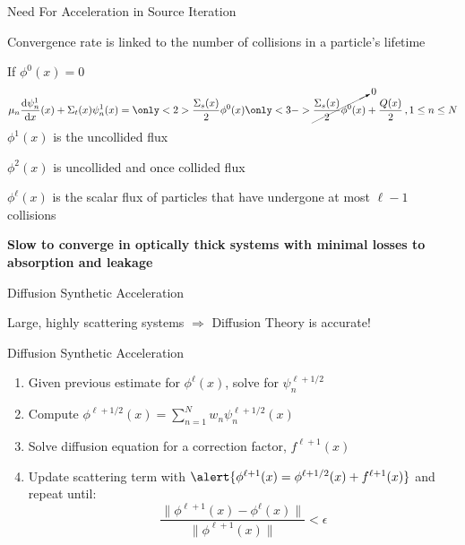 \documentclass[10pt]{beamer}
\newcommand{\ud}{\mathop{}\!\mathrm{d}} %
\newcommand{\dderiv}[2]{\frac{\ud #1}{\ud #2}}
\begin{document}
\begin{frame}{Need For Acceleration in Source Iteration}

	Convergence rate is linked to the number of collisions in a particle's lifetime

    If $\phi^0(x) = 0$
    \begin{equation*}
        \mu_n \dderiv{\psi_n^{1}}{x}(x) + \Sigma_t(x) \psi_n^{1}(x) =
        \vphantom{\cancelto{0}{\frac{\Sigma_s(x)}{2} \phi^{0}(x)}} 
        \only<2>{\frac{\Sigma_s(x)}{2} \phi^{0}(x)}
        \only<3->{\cancelto{0}{\frac{\Sigma_s(x)}{2} \phi^{0}(x)}}
         + \frac{Q(x)}{2} \,, 1 \leq n \leq N 
    \end{equation*}
    $\phi^1(x) $ is the uncollided flux 

    $\phi^2(x)$ is uncollided and once collided flux 

    $\phi^{\ell}(x)$ is the scalar flux of particles that have undergone at most $\ell - 1$ collisions 

    \textbf{Slow to converge in optically thick systems with minimal losses to absorption and leakage}

\end{frame}

\begin{frame}{Diffusion Synthetic Acceleration}

    Large, highly scattering systems $\Rightarrow$ Diffusion Theory is accurate! 


    \begin{exampleblock}{Diffusion Synthetic Acceleration}
    \begin{enumerate}
        \item Given previous estimate for $\phi^{\ell}(x)$, solve for $\psi_n^{\ell+1/2}$

        \item Compute $\phi^{\ell+1/2}(x) = 
            \sum_{n=1}^N w_n \psi_n^{\ell+1/2}(x)$ 

        \item \alert{Solve diffusion equation for a correction factor, $f^{\ell+1}(x)$}

        \item Update scattering term with 
            $\alert{\phi^{\ell+1}(x) = \phi^{\ell+1/2}(x) + f^{\ell+1}(x)}$ 
        and repeat until: 
             \begin{equation*}
                \frac{\|\phi^{\ell+1}(x) - \phi^{\ell}(x)\|}{\|\phi^{\ell+1}(x)\|} < \epsilon 
             \end{equation*}

    \end{enumerate}
    \end{exampleblock}

\end{frame}
\end{document}
